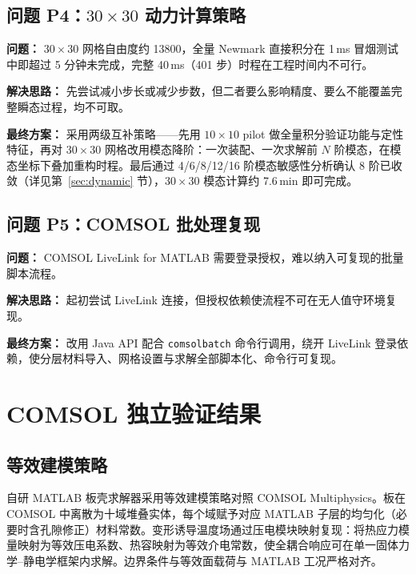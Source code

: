 \documentclass[11pt,a4paper]{ctexart}
\begin{document}
\subsection{问题 P4：$30\times30$ 动力计算策略}

\textbf{问题：} $30\times30$ 网格自由度约 13800，全量 Newmark 直接积分在 1\,ms 冒烟测试中即超过 5 分钟未完成，完整 40\,ms（401 步）时程在工程时间内不可行。

\textbf{解决思路：} 先尝试减小步长或减少步数，但二者要么影响精度、要么不能覆盖完整瞬态过程，均不可取。

\textbf{最终方案：} 采用两级互补策略——先用 $10\times10$ pilot 做全量积分验证功能与定性特征，再对 $30\times30$ 网格改用模态降阶：一次装配、一次求解前 $N$ 阶模态，在模态坐标下叠加重构时程。最后通过 4/6/8/12/16 阶模态敏感性分析确认 8 阶已收敛（详见第~\ref{sec:dynamic} 节），$30\times30$ 模态计算约 7.6\,min 即可完成。

\subsection{问题 P5：COMSOL 批处理复现}

\textbf{问题：} COMSOL LiveLink for MATLAB 需要登录授权，难以纳入可复现的批量脚本流程。

\textbf{解决思路：} 起初尝试 LiveLink 连接，但授权依赖使流程不可在无人值守环境复现。

\textbf{最终方案：} 改用 Java API 配合 \texttt{comsolbatch} 命令行调用，绕开 LiveLink 登录依赖，使分层材料导入、网格设置与求解全部脚本化、命令行可复现。

\section{COMSOL 独立验证结果}

\subsection{等效建模策略}

自研 MATLAB 板壳求解器采用等效建模策略对照 COMSOL Multiphysics。板在 COMSOL 中离散为十域堆叠实体，每个域赋予对应 MATLAB 子层的均匀化（必要时含孔隙修正）材料常数。变形诱导温度场通过压电模块映射复现：将热应力模量映射为等效压电系数、热容映射为等效介电常数，使全耦合响应可在单一固体力学--静电学框架内求解。边界条件与等效面载荷与 MATLAB 工况严格对齐。
\end{document}
